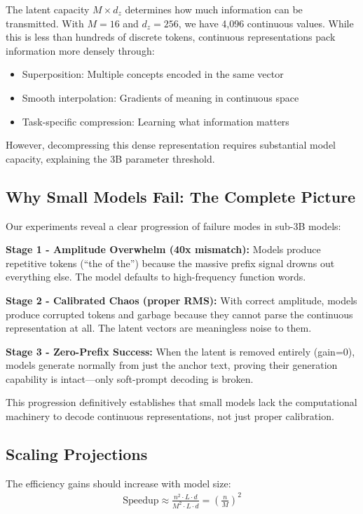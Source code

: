 \documentclass{article}
\begin{document}
The latent capacity $M \times d_z$ determines how much information can be transmitted. With $M=16$ and $d_z=256$, we have 4,096 continuous values. While this is less than hundreds of discrete tokens, continuous representations pack information more densely through:
\begin{itemize}
\item Superposition: Multiple concepts encoded in the same vector
\item Smooth interpolation: Gradients of meaning in continuous space
\item Task-specific compression: Learning what information matters
\end{itemize}

However, decompressing this dense representation requires substantial model capacity, explaining the 3B parameter threshold.

\subsection{Why Small Models Fail: The Complete Picture}

Our experiments reveal a clear progression of failure modes in sub-3B models:

\textbf{Stage 1 - Amplitude Overwhelm (40x mismatch):} Models produce repetitive tokens (``the of the'') because the massive prefix signal drowns out everything else. The model defaults to high-frequency function words.

\textbf{Stage 2 - Calibrated Chaos (proper RMS):} With correct amplitude, models produce corrupted tokens and garbage because they cannot parse the continuous representation at all. The latent vectors are meaningless noise to them.

\textbf{Stage 3 - Zero-Prefix Success:} When the latent is removed entirely (gain=0), models generate normally from just the anchor text, proving their generation capability is intact—only soft-prompt decoding is broken.

This progression definitively establishes that small models lack the computational machinery to decode continuous representations, not just proper calibration.

\subsection{Scaling Projections}

The efficiency gains should increase with model size:
\begin{align}
\text{Speedup} \approx \frac{n^2 \cdot L \cdot d}{M^2 \cdot L \cdot d} = \left(\frac{n}{M}\right)^2
\end{align}
\end{document}
